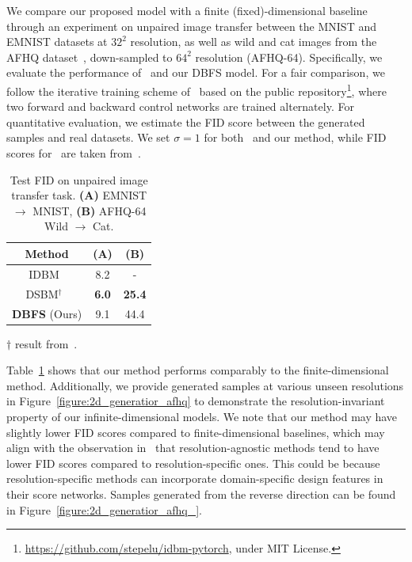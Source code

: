 \documentclass[nohyperref]{article}
\theoremstyle{plain}
\theoremstyle{remark}
\begin{document}
We compare our proposed model with a finite (fixed)-dimensional baseline through an experiment on unpaired image transfer between the MNIST and EMNIST datasets at $32^2$ resolution, as well as wild and cat images from the AFHQ dataset~\citep{choi2020starganv2}, down-sampled to $64^2$ resolution (AFHQ-64). Specifically, we evaluate the performance of~\citep{peluchetti2023diffusion, shi2024diffusion} and our DBFS model. For a fair comparison, we follow the iterative training scheme of~\citep{peluchetti2023diffusion} based on the public repository\footnote{\url{https://github.com/stepelu/idbm-pytorch}, under MIT License.}, where two forward and backward control networks are trained alternately. For quantitative evaluation, we estimate the FID score between the generated samples and real datasets. We set $\sigma = 1$ for both~\citep{peluchetti2023diffusion} and our method, while FID scores for~\citep{shi2024diffusion} are taken from~\citep{debortoli2024schr}. 
\begin{table}
\vspace{-4mm}
\centering
\scriptsize
    \caption{ Test FID on unpaired image transfer task. \textbf{(A)} EMNIST $\to$ MNIST, \textbf{(B)} AFHQ-64 Wild $\to$ Cat. }
    \setlength{\tabcolsep}{3.0pt}
\begin{tabular}{c|c c}
        \toprule
        Method & \textbf{(A)} & \textbf{(B)}\\
        \midrule
        IDBM~\citep{peluchetti2023diffusion} & 8.2 & -\\
        DSBM$^{\dag}$~\citep{shi2024diffusion} & \textbf{6.0} & \textbf{25.4} \\
        \midrule
        \textbf{DBFS} (Ours) & 9.1 & 44.4  \\
        \bottomrule
    \end{tabular}
\begin{tablenotes}
\item $\dag$  result from~\citep{debortoli2024schr}.
\end{tablenotes}\label{tab:2d_generation}
\end{table}
Table~\ref{tab:2d_generation} shows that our method performs comparably to the finite-dimensional method. Additionally, we provide generated samples at various unseen resolutions in Figure~\ref{figure:2d_generatior_afhq} to demonstrate the resolution-invariant property of our infinite-dimensional models. We note that our method may have slightly lower FID scores compared to finite-dimensional baselines, which may align with the observation in~\citep{zhuang2023diffusion} that resolution-agnostic methods tend to have lower FID scores compared to resolution-specific ones. This could be because resolution-specific methods can incorporate domain-specific design features in their score networks. Samples generated from the reverse direction can be found in Figure~\ref{figure:2d_generatior_afhq_}.
\end{document}
